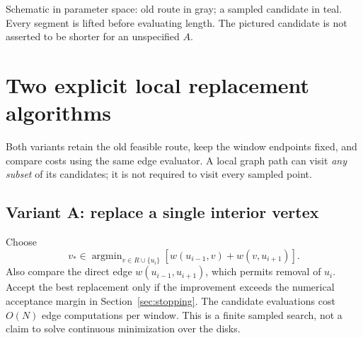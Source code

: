 \documentclass[11pt,letterpaper]{article}
\begin{document}
\begin{center}
\end{center}
{\small Schematic in parameter space: old route in gray; a sampled candidate in teal. Every segment is lifted before evaluating length. The pictured candidate is not asserted to be shorter for an unspecified $A$.}

\clearpage
\section{Two explicit local replacement algorithms}
Both variants retain the old feasible route, keep the window endpoints fixed, and compare costs using the same edge evaluator. A local graph path can visit \emph{any subset} of its candidates; it is not required to visit every sampled point.

\subsection{Variant A: replace a single interior vertex}
Choose
\begin{equation}\label{eq:single}
 v_*\in\mathop{\arg\min}_{v\in R\cup\{u_i\}}
 \left[w(u_{i-1},v)+w(v,u_{i+1})\right].
\end{equation}
Also compare the direct edge $w(u_{i-1},u_{i+1})$, which permits removal of $u_i$. Accept the best replacement only if the improvement exceeds the numerical acceptance margin in Section~\ref{sec:stopping}. The candidate evaluations cost $O(N)$ edge computations per window. This is a finite sampled search, not a claim to solve continuous minimization over the disks.
\end{document}
